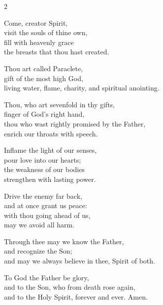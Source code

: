 \documentclass[12pt]{book}
\begin{document}
 
 \twosided[pc] %

\thispagestyle{empty}





\begin{multicols}{2}
\raggedcolumns
\begin{enpars}
Come, creator Spirit,\\
visit the souls of thine own,\\
fill with heavenly grace\\
the breasts that thou hast created.

Thou art called Paraclete,\\
gift of the most high God,\\
living water, flame, charity, and spiritual anointing.

Thou, who art sevenfold in thy gifts,\\
finger of God's right hand,\\
thou who wast rightly promised by the Father,\\
enrich our throats with speech.

Inflame the light of our senses,\\
pour love into our hearts;\\
the weakness of our bodies\\
strengthen with lasting power.

Drive the enemy far back,\\
and at once grant us peace:\\
with thou going ahead of us,\\
may we avoid all harm.

Through thee may we know the Father,\\
and recognize the Son;\\
and may we always believe in thee, Spirit of both.

To God the Father be glory,\\
and to the Son, who from death rose again,\\
and to the Holy Spirit, forever and ever. Amen.

\end{enpars}
\end{multicols}
\end{document}
